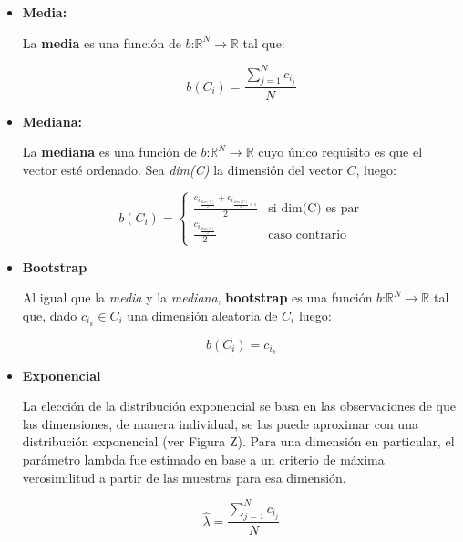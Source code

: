 	\begin{itemize}
	
	\item \textbf{Media:}
	
	La \textbf{media} es una función de $\textit{b:}\mathbb{R}^{N} \rightarrow \mathbb{R}$ tal que:
	
	$$b(C_i) = \frac{\sum_{j=1}^N c_{i_j}}{N} $$

	\item \textbf{Mediana:}
	
	La \textbf{mediana} es una función de $\textit{b:}\mathbb{R}^{N} \rightarrow \mathbb{R}$ cuyo único requisito es que el vector esté ordenado. Sea \textit{dim(C)} la dimensión del vector $C$, luego:
	
	\[
    		b(C_i) = 
		\begin{cases}
    			\frac{c_{i_{\frac{dim(C)}{2}}} + c_{i_{\frac{dim(C)}{2}+1}}}{2} & \text{si dim(C) es par}\\
    			\frac{c_{i_{\frac{dim(C)}{2}}}}{2} & \text{caso contrario}
		\end{cases}
	\]
	
	\item \textbf{Bootstrap}
	
	Al igual que la \textit{media} y la \textit{mediana}, \textbf{bootstrap} es una función $\textit{b:}\mathbb{R}^{N} \rightarrow \mathbb{R}$ tal que, dado $c_{i_k} \in C_{i}$ una dimensión aleatoria de $C_{i}$ luego:
	
	$$ b(C_i) = c_{i_k} $$

	\item \textbf{Exponencial}
	
	La elección de la distribución exponencial se basa en las observaciones de que las dimensiones, de manera individual, se las puede aproximar con una distribución exponencial (ver Figura Z). Para una dimensión en particular, el parámetro lambda fue estimado en base a un criterio de máxima verosimilitud a partir de las muestras para esa dimensión.
	
	$$\hat{\lambda} = \frac{\sum_{j=1}^N c_{i_j}}{N} $$
	
	\end{itemize}